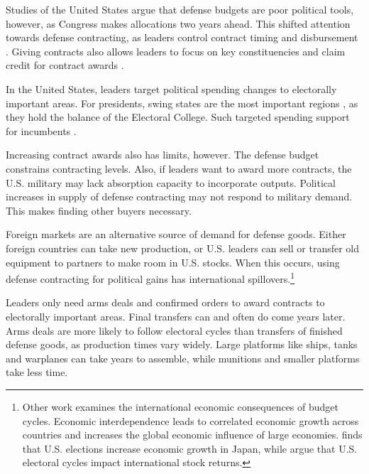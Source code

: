 \documentclass[12pt]{article}
\begin{document}
Studies of the United States argue that defense budgets are poor political tools, however, as Congress makes allocations two years ahead.
This shifted attention towards defense contracting, as leaders control contract timing and disbursement \citep{Mayer1995, DerouenHeo2000}.
Giving contracts also allows leaders to focus on key constituencies and claim credit for contract awards \citep{DerouenHeo2000}. 


In the United States, leaders target political spending changes to electorally important areas.
For presidents, swing states are the most important regions \citep{KrinerReeves2015}, as they hold the balance of the Electoral College. 
Such targeted spending support for incumbents \citep{KrinerReeves2012}.




Increasing contract awards also has limits, however. 
The defense budget constrains contracting levels. 
Also, if leaders want to award more contracts, the U.S. military may lack absorption capacity to incorporate outputs.
Political increases in supply of defense contracting may not respond to military demand.
This makes finding other buyers necessary.


Foreign markets are an alternative source of demand for defense goods.
Either foreign countries can take new production, or U.S. leaders can sell or transfer old equipment to partners to make room in U.S. stocks. 
When this occurs, using defense contracting for political gains has international spillovers.\footnote{%
Other work examines the international economic consequences of budget cycles.
Economic interdependence leads to correlated economic growth across countries \citep{Kayser2006} and increases the global economic influence of large economies. 
\citet{Ito1991} finds that U.S. elections increase economic growth in Japan, while \citet{FoersterSchmitz1997} argue that U.S. electoral cycles impact international stock returns.
}


Leaders only need arms deals and confirmed orders to award contracts to electorally important areas.
Final transfers can and often do come years later. 
Arms deals are more likely to follow electoral cycles than transfers of finished defense goods, as production times vary widely. 
Large platforms like ships, tanks and warplanes can take years to assemble, while munitions and smaller platforms take less time. 
\end{document}
